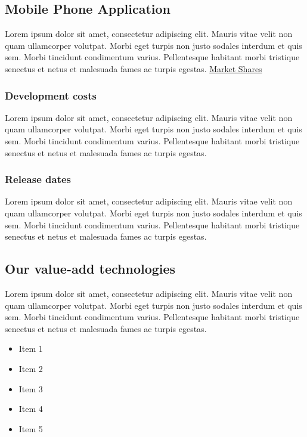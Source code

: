 \documentclass[11pt,titlepage]{article}
\begin{document}
\subsection{Mobile Phone Application}
Lorem ipsum dolor sit amet, consectetur adipiscing elit. Mauris vitae velit 
non quam ullamcorper volutpat. Morbi eget turpis non justo sodales interdum 
et quis sem. Morbi tincidunt condimentum varius. Pellentesque habitant morbi 
tristique senectus et netus et malesuada fames ac turpis egestas.\newline
\hyperlink{market_share}{Market Shares}
 
\subsubsection{Development costs}
Lorem ipsum dolor sit amet, consectetur adipiscing elit. Mauris vitae velit 
non quam ullamcorper volutpat. Morbi eget turpis non justo sodales interdum 
et quis sem. Morbi tincidunt condimentum varius. Pellentesque habitant morbi 
tristique senectus et netus et malesuada fames ac turpis egestas.\newline

\subsubsection{Release dates}
Lorem ipsum dolor sit amet, consectetur adipiscing elit. Mauris vitae velit 
non quam ullamcorper volutpat. Morbi eget turpis non justo sodales interdum 
et quis sem. Morbi tincidunt condimentum varius. Pellentesque habitant morbi 
tristique senectus et netus et malesuada fames ac turpis egestas.\newline

\subsection{Our value-add technologies}
Lorem ipsum dolor sit amet, consectetur adipiscing elit. Mauris vitae velit 
non quam ullamcorper volutpat. Morbi eget turpis non justo sodales interdum 
et quis sem. Morbi tincidunt condimentum varius. Pellentesque habitant morbi 
tristique senectus et netus et malesuada fames ac turpis egestas.\newline
\begin{itemize}
\item Item 1
\item Item 2
\item Item 3
\item Item 4
\item Item 5
\end{itemize}
\end{document}
